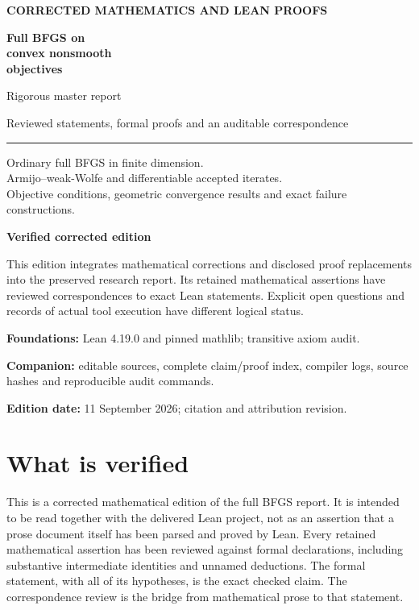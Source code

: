 \documentclass[10pt,oneside,openany]{book}
\theoremstyle{remark}\newtheorem{remark}{Remark}[chapter]
\begin{document}
\begin{titlepage}
\color{Ink}
{\large\sffamily\bfseries CORRECTED MATHEMATICS AND LEAN PROOFS}\par
\vspace{19mm}
{\Huge\bfseries Full BFGS on\\[3mm]convex nonsmooth\\[3mm]objectives}\par
\vspace{11mm}
{\Large Rigorous master report}\par
\vspace{6mm}
{\large Reviewed statements, formal proofs and an auditable correspondence}\par
\vspace{9mm}
{\color{Accent}\rule{\textwidth}{1.2pt}}\par
\vspace{6mm}
\begin{minipage}{.94\textwidth}
\large
Ordinary full BFGS in finite dimension.\\
Armijo--weak-Wolfe and differentiable accepted iterates.\\
Objective conditions, geometric convergence results and exact failure constructions.
\end{minipage}
\vfill
\begin{minipage}{.94\textwidth}
\textbf{Verified corrected edition}\par
\vspace{4mm}
This edition integrates mathematical corrections and disclosed proof replacements into the preserved research report. Its retained mathematical assertions have reviewed correspondences to exact Lean statements. Explicit open questions and records of actual tool execution have different logical status.\par
\vspace{4mm}
\textbf{Foundations:} Lean 4.19.0 and pinned mathlib; transitive axiom audit.\par
\textbf{Companion:} editable sources, complete claim/proof index, compiler logs, source hashes and reproducible audit commands.\par
\textbf{Edition date:} 11 September 2026; citation and attribution revision.
\end{minipage}
\end{titlepage}
\frontmatter
\chapter*{What is verified}
This is a corrected mathematical edition of the full BFGS report. It is intended to be read together with the delivered Lean project, not as an assertion that a prose document itself has been parsed and proved by Lean. Every retained mathematical assertion has been reviewed against formal declarations, including substantive intermediate identities and unnamed deductions. The formal statement, with all of its hypotheses, is the exact checked claim. The correspondence review is the bridge from mathematical prose to that statement.
\end{document}

